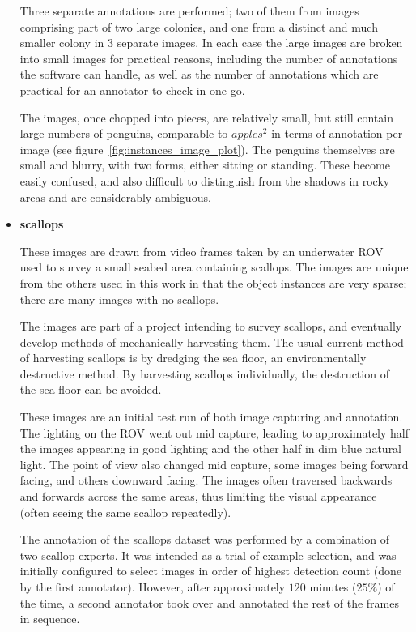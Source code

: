 \begin{itemize}
Three separate annotations are performed; two of them from images comprising part of two large colonies, and one from a distinct and much smaller colony in 3 separate images. In each case the large images are broken into small images for practical reasons, including the number of annotations the software can handle, as well as the number of annotations which are  practical for an annotator to check in one go.
    
The images, once chopped into pieces, are relatively small, but still contain large numbers of penguins, comparable to $apples^2$ in terms of annotation per image (see figure~\ref{fig:instances_image_plot}). The penguins themselves are small and blurry, with two forms, either sitting or standing. These become  easily confused, and also difficult to distinguish from the shadows in rocky areas and are considerably ambiguous. 
    \item{\bf{scallops}}
    
These images are drawn from video frames taken by an underwater \gls{ROV} used to survey a small seabed area containing scallops. The images are unique from the others used in this work in that the object instances are very sparse; there are many images with no scallops. 

The images are part of a project intending to survey scallops, and eventually develop methods of mechanically harvesting them. The usual current method of harvesting scallops is by dredging the sea floor, an environmentally destructive method. By harvesting scallops individually, the destruction of the sea floor can be avoided.

These images are an initial test run of both image capturing and annotation. The lighting on the \gls{ROV} went out mid capture, leading to approximately half the images appearing in good lighting and the other half in dim blue natural light. The point of view also changed mid capture, some images being forward facing, and others downward facing. The images often traversed backwards and forwards across the same areas, thus limiting the visual appearance (often seeing the same scallop repeatedly). 

The annotation of the scallops dataset was performed by a combination of two scallop experts. It was intended as a trial of example selection, and was initially configured to select images in order of highest detection count (done by the first annotator). However, after approximately $120$ minutes ($25\%$) of the time, a second annotator took over and annotated the rest of the frames in sequence. 


\end{itemize}
